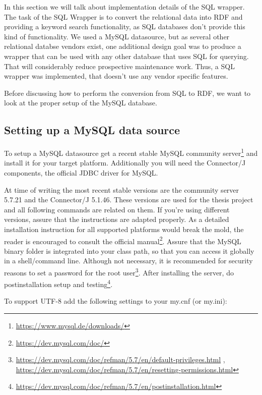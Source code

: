 In this section we will talk about implementation details of the SQL wrapper. 
The task of the SQL Wrapper is to convert the relational data into RDF and providing a keyword search functionality, as SQL databases don't provide this kind of  functionality.
We used a MySQL datasource, but as several other relational databse vendors exist, one additional design goal was to produce a wrapper that can be used with any other database that uses SQL for querying. That will considerably reduce prospective maintenance work.
Thus, a SQL wrapper was implemented, that doesn't use any vendor specific features.

Before discussing how to perform the conversion from SQL to RDF, we want to look at the proper setup of the MySQL database.



\subsection{Setting up a MySQL data source}

To setup a MySQL datasource get a recent stable MySQL community server\footnote{\url{https://www.mysql.de/downloads/}} 
and install it for your target platform. Additionally you will need the Connector/J components, the official JDBC driver for MySQL. 

At time of writing the most recent stable versions are the community server 5.7.21 and the Connector/J 5.1.46. These versions are used for the thesis project and all following commands are related on them. If you're using 
different versions, assure that the instructions are adapted properly. As a detailed installation instruction for all supported platforms would break the mold, the reader is encouraged to consult the official 
manual\footnote{\url{https://dev.mysql.com/doc/}}. 
Assure that the MySQL binary folder is integrated into your class path, so that you can access it globally in a shell/command line. Although not necessary, it is recommended for security reasons 
to set a password for the root user\footnote{\url{https://dev.mysql.com/doc/refman/5.7/en/default-privileges.html} , \url{https://dev.mysql.com/doc/refman/5.7/en/resetting-permissions.html}}. 
After installing the server, do postinstallation setup and testing\footnote{\url{https://dev.mysql.com/doc/refman/5.7/en/postinstallation.html}}. 

To support UTF-8 add the following settings to your my.cnf (or my.ini):

